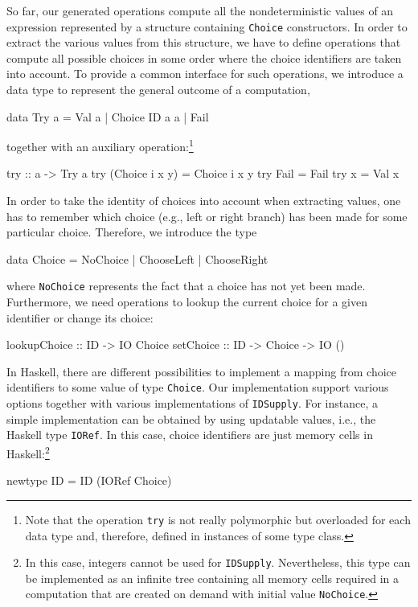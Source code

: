 \documentclass{llncs}
\newcommand{\code}[1]{\mbox{\small\texttt{#1}}}
\begin{document}
So far, our generated operations compute all the nondeterministic
values of an expression represented by a structure containing
\code{Choice} constructors. In order to extract the various
values from this structure, we have to define operations
that compute all possible choices in some order where the choice identifiers
are taken into account.
To provide a common interface for such operations, we introduce
a data type to represent the general outcome of a computation,
\begin{haskell}
  data Try a = Val a | Choice ID a a | Fail
\end{haskell}
together with an auxiliary operation:\footnote{Note that the
operation \code{try} is not really polymorphic but overloaded
for each data type and, therefore, defined in instances of some type class.}
\begin{haskell}
  try :: a -> Try a
  try (Choice i x y) = Choice i x y
  try Fail           = Fail
  try x              = Val x
\end{haskell}
In order to take the identity of choices into account when extracting values,
one has to remember which choice (e.g., left or right branch)
has been made for some particular choice.
Therefore, we introduce the type
\begin{haskell}
  data Choice = NoChoice | ChooseLeft | ChooseRight
\end{haskell}
where \code{NoChoice} represents the fact that a choice has not yet been made.
Furthermore, we need operations to lookup the current choice
for a given identifier or change its choice:
\begin{haskell}
  lookupChoice :: ID -> IO Choice
  setChoice    :: ID -> Choice -> IO ()
\end{haskell}
In Haskell, there are different possibilities to implement a mapping
from choice identifiers to some value of type \code{Choice}.
Our implementation support various options together with various
implementations of \code{IDSupply}.
For instance, a simple implementation can be obtained by
using updatable values, i.e., the Haskell type \code{IORef}.
In this case, choice identifiers are just memory cells in Haskell:\footnote{%
In this case, integers cannot be used for \code{IDSupply}.
Nevertheless,
this type can be implemented as an infinite tree containing
all memory cells required in a computation that are created
on demand with initial value \code{NoChoice}.}
\begin{haskell}
  newtype ID = ID (IORef Choice)
\end{haskell}
\end{document}
